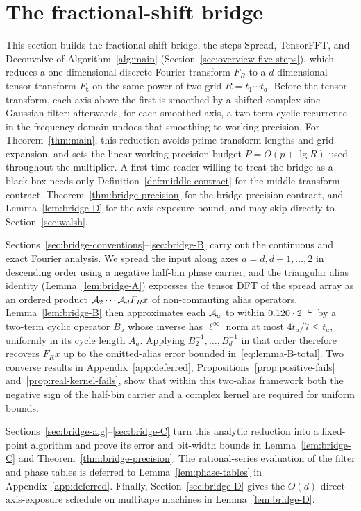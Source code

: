 \section{The fractional-shift bridge}\label{sec:bridge}\label{sec:bridge-precision}

This section builds the fractional-shift bridge, the steps \textsf{Spread}, \textsf{TensorFFT}, and \textsf{Deconvolve}
of Algorithm~\ref{alg:main} (Section~\ref{sec:overview-five-steps}), which reduces a one-dimensional discrete Fourier transform $F_R$
to a $d$-dimensional tensor transform $F_{\mathbf t}$ on the same power-of-two grid $R=t_1\cdots t_d$. Before the tensor
transform, each axis above the first is smoothed by a shifted complex sinc-Gaussian filter; afterwards, for each
smoothed axis, a two-term cyclic recurrence in the frequency domain undoes that smoothing to working precision. For
Theorem~\ref{thm:main}, this reduction avoids prime transform lengths and grid expansion, and sets the linear
working-precision budget $P=O(p+\lg R)$ used throughout the multiplier. A first-time reader willing to treat the bridge
as a black box needs only Definition~\ref{def:middle-contract} for the middle-transform contract,
Theorem~\ref{thm:bridge-precision} for the bridge precision contract, and Lemma~\ref{lem:bridge-D} for the axis-exposure
bound, and may skip directly to Section~\ref{sec:walsh}.

Sections~\ref{sec:bridge-conventions}--\ref{sec:bridge-B} carry out the continuous and exact Fourier analysis. We spread
the input along axes $a=d,d-1,\dots,2$ in descending order using a negative half-bin phase carrier, and the triangular
alias identity (Lemma~\ref{lem:bridge-A}) expresses the tensor DFT of the spread array as an ordered product
$\mathcal{A}_2\cdots\mathcal{A}_d F_R x$ of non-commuting alias operators. Lemma~\ref{lem:bridge-B} then approximates each $\mathcal{A}_a$ to
within $0.120\cdot 2^{-\omega}$ by a two-term cyclic operator $B_a$ whose inverse has $\ell^\infty$ norm at most
$4t_a/7\le t_a$, uniformly in its cycle length $A_a$. Applying $B_2^{-1},\dots,B_d^{-1}$ in that order therefore
recovers $F_R x$ up to the omitted-alias error bounded in~\eqref{eq:lemma-B-total}. Two converse results in
Appendix~\ref{app:deferred}, Propositions~\ref{prop:positive-fails} and~\ref{prop:real-kernel-fails}, show that within
this two-alias framework both the negative sign of the half-bin carrier and a complex kernel are required for uniform
bounds.

Sections~\ref{sec:bridge-alg}--\ref{sec:bridge-C} turn this analytic reduction into a fixed-point algorithm and prove
its error and bit-width bounds in Lemma~\ref{lem:bridge-C} and Theorem~\ref{thm:bridge-precision}. The rational-series
evaluation of the filter and phase tables is deferred to Lemma~\ref{lem:phase-tables} in Appendix~\ref{app:deferred}.
Finally, Section~\ref{sec:bridge-D} gives the $O(d)$ direct axis-exposure schedule on multitape machines in
Lemma~\ref{lem:bridge-D}.

